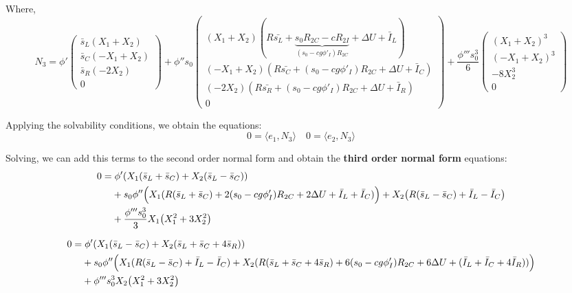 \documentclass[ENG]{fancynotes}
\begin{document}
Where, 
\[
N_3 = 
\phi'\begin{pmatrix}
\bar{s}_L(X_1+X_2)\\
\bar{s}_C(-X_1+X_2)\\ 
\bar{s}_R(-2X_2)\\ 
0
\end{pmatrix} +\phi''s_0\begin{pmatrix}
(X_1+X_2)(R\bar{s_L} + \underbrace{s_0R_{2C} - cR_{2I}}_{(s_0-cg\phi'_I)R_{2C}}+ \Delta U + \bar{I}_L)\\
(-X_1+X_2)(R\bar{s_C} +(s_0-cg\phi'_I)R_{2C}+ \Delta U + \bar{I}_C)\\ 
(-2X_2)(R\bar{s_R} +(s_0-cg\phi'_I)R_{2C}+ \Delta U + \bar{I}_R)\\ 
0
\end{pmatrix} + \frac{\phi'''s_0^3}{6} 
\begin{pmatrix}
(X_1 + X_2)^3\\  
(-X_1 + X_2)^3\\  
-8X_2^3 \\ 
 0
\end{pmatrix}
\]

Applying the solvability conditions, we obtain the equations:
\begin{equation}
0 = \langle e_1, N_3\rangle \quad 0 = \langle e_2, N_3 \rangle
\end{equation}

Solving, we can add this terms to the second order normal form and obtain the \textbf{third order normal form} equations: 
\begin{equation}
\begin{aligned}
0 = & \; \phi'(X_1(\bar{s}_L+ \bar{s}_C)+X_2(\bar{s}_L -\bar{s}_C))\\
&+ s_0 \phi'' \Bigl( X_1(R(\bar{s}_L+\bar{s}_C)+2(s_0-cg\phi'_I)R_{2C}  + 2\Delta U + \bar{I}_L + \bar{I}_C) \Bigr) + X_2\bigl(R(\bar{s}_L-\bar{s}_C) + \bar{I}_L - \bar{I}_C\bigr)\\
&+ \frac{\phi'''s_0^3}{3}  X_1\bigl(X_1^2+3X_2^2\bigr)
\end{aligned}
\end{equation}

\begin{equation}
\begin{aligned}
0 = &\; \phi'(X_1(\bar{s}_L- \bar{s}_C)+X_2(\bar{s}_L +\bar{s}_C+4\bar{s}_R))\\ 
& + s_0\phi'' \Bigl(X_1(R(\bar{s}_L-\bar{s}_C) + \bar{I}_L - \bar{I}_C) + X_2(R(\bar{s}_L+\bar{s}_C+ 4\bar{s}_R)+ 6(s_0-cg\phi'_I)R_{2C}  + 6\Delta U+ (\bar{I}_L + \bar{I}_C + 4\bar{I}_R))\Bigr)\\
&+ \phi'''s_0^3 X_2\bigl(X_1^2+3X_2^2\bigr)
\end{aligned}
\end{equation}
\end{document}
